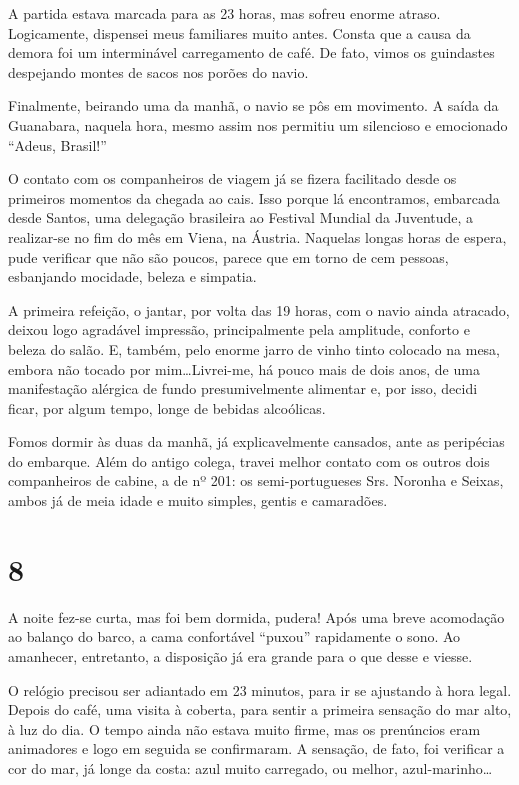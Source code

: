 A partida estava marcada para as 23 horas, mas sofreu enorme atraso. Logicamente, dispensei meus familiares muito antes. Consta que a causa da demora foi um interminável carregamento de café. De fato, vimos os guindastes despejando montes de sacos nos porões do navio.

Finalmente, beirando uma da manhã, o navio se pôs em movimento. A saída da Guanabara, naquela hora, mesmo assim nos permitiu um silencioso e emocionado ``Adeus, Brasil!''

O contato com os companheiros de viagem já se fizera facilitado desde os primeiros momentos da chegada ao cais. Isso porque lá encontramos, embarcada desde Santos, uma delegação brasileira ao Festival Mundial da Juventude, a realizar-se no fim do mês em Viena, na Áustria. Naquelas longas horas de espera, pude verificar que não são poucos, parece que em torno de cem pessoas, esbanjando mocidade, beleza e simpatia.

A primeira refeição, o jantar, por volta das 19 horas, com o navio ainda atracado, deixou logo agradável impressão, principalmente pela amplitude, conforto e beleza do salão. E, também, pelo enorme jarro de vinho tinto colocado na mesa, embora não tocado por mim\ldots Livrei-me, há pouco mais de dois anos, de uma manifestação alérgica de fundo presumivelmente alimentar e, por isso, decidi ficar, por algum tempo, longe de bebidas alcoólicas.

Fomos dormir às duas da manhã, já explicavelmente cansados, ante as peripécias do embarque. Além do antigo colega, travei melhor contato com os outros dois companheiros de cabine, a de nº 201: os semi-portugueses Srs. Noronha e Seixas, ambos já de meia idade e muito simples, gentis e camaradões.

\section*{8 \adfflatleafright {}}
A noite fez-se curta, mas foi bem dormida, pudera! Após uma breve acomodação ao balanço do barco, a cama confortável ``puxou'' rapidamente o sono. Ao amanhecer, entretanto, a disposição já era grande para o que desse e viesse.

O relógio precisou ser adiantado em 23 minutos, para ir se ajustando à hora legal. Depois do café, uma visita à coberta, para sentir a primeira sensação do mar alto, à luz do dia. O tempo ainda não estava muito firme, mas os prenúncios eram animadores e logo em seguida se confirmaram. A sensação, de fato, foi verificar a cor do mar, já longe da costa: azul muito carregado, ou melhor, azul-marinho\ldots


